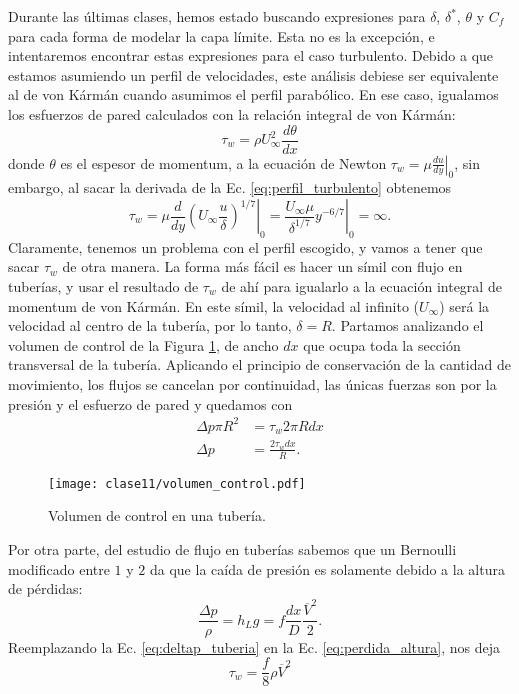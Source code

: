 Durante las últimas clases, hemos estado buscando expresiones para $\delta$, $\delta^*$, $\theta$ y $C_f$ para cada forma de modelar la capa límite. 
Esta no es la excepción, e intentaremos encontrar estas expresiones para el caso turbulento.
Debido a que estamos asumiendo un perfil de velocidades, este análisis debiese ser equivalente al de von Kármán cuando asumimos el perfil parabólico.
En ese caso, igualamos los esfuerzos de pared calculados con la relación integral de von Kármán:
%
\begin{equation}\label{eq:integral_vK}
\tau_w = \rho U_\infty^2 \frac{d\theta}{dx}
\end{equation}
%
donde $\theta$ es el espesor de momentum, a la ecuación de Newton $\tau_w = \left.\mu\frac{du}{dy}\right|_0$, sin embargo, al sacar la derivada de la Ec. \eqref{eq:perfil_turbulento} obtenemos
%
\begin{equation}
\tau_w = \left.\mu \frac{d}{dy}\left(U_\infty\frac{u}{\delta}\right)^{1/7}\right|_0 = \left.\frac{U_\infty\mu}{\delta^{1/7}}y^{-6/7}\right|_0 = \infty.
\end{equation}
%
Claramente, tenemos un problema con el perfil escogido, y vamos a tener que sacar $\tau_w$ de otra manera.
La forma más fácil es hacer un símil con flujo en tuberías, y usar el resultado de $\tau_w$ de ahí para igualarlo a la ecuación integral de momentum de von Kármán.
En este símil, la velocidad al infinito ($U_\infty$) será la velocidad al centro de la tubería, por lo tanto, $\delta=R$.
Partamos analizando el volumen de control de la Figura \ref{fig:volumen_control}, de ancho $dx$ que ocupa toda la sección transversal de la tubería.
Aplicando el principio de conservación de la cantidad de movimiento, los flujos se cancelan por continuidad, las únicas fuerzas son por la presión y el esfuerzo de pared y quedamos con
%
\begin{align}\label{eq:deltap_tuberia}
\Delta p\pi R^2 &= \tau_w2\pi Rdx\nonumber\\
\Delta p &= \frac{2\tau_w dx}{R}.
\end{align}
%
\begin{figure}
\centering
\texttt{[image: clase11/volumen\_control.pdf]}
\caption{Volumen de control en una tubería.}
\label{fig:volumen_control}
\end{figure}

Por otra parte, del estudio de flujo en tuberías sabemos que un Bernoulli modificado entre $1$ y $2$ da que la caída de presión es solamente debido a la altura de pérdidas:
%
\begin{equation}\label{eq:perdida_altura}
\frac{\Delta p}{\rho} = h_L g = f \frac{dx}{D}\frac{\overline{V}^2}{2}.
\end{equation}
%
Reemplazando la Ec. \eqref{eq:deltap_tuberia} en la Ec. \eqref{eq:perdida_altura}, nos deja
%
\begin{equation}
\tau_w = \frac{f}{8}\rho\overline{V}^2
\end{equation}

